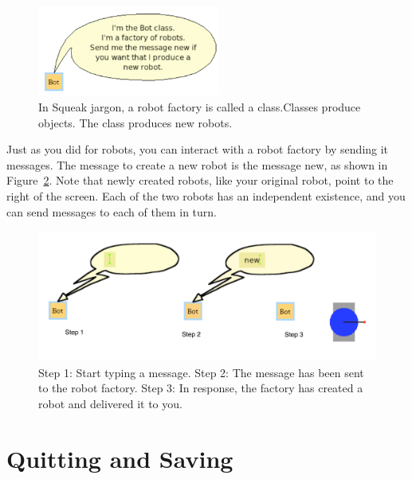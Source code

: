 \documentclass[a4paper,10pt,twoside]{book}
\begin{document}
\begin{figure}[!h]\centerline{\includegraphics[width=6cm]{14-classBalloon2}}
\caption{In Squeak jargon, a robot factory is called a class.Classes produce objects. The  class produces new robots. 
 \label{fig:classBalloon}}
\end{figure}

Just as you did for robots, you can interact with a robot factory by sending it messages. 
The message to create a new robot is the message new, as shown in Figure~\ref{fig:turtleBoxNew}. Note that 
newly created robots, like your original robot, point to the right of the screen. Each of the two 
robots has an independent existence, and you can send messages to each of them in turn. 


\begin{figure}[!h]\centerline{\includegraphics[width=14cm]{15-creatingARobot2}}
\caption{Step 1: Start typing a message. Step 2: The message  has been sent to the robot 
factory. Step 3: In response, the factory has created a robot and delivered it to you. 
\label{fig:turtleBoxNew}}
\end{figure}





\section{Quitting and Saving}
\end{document}
